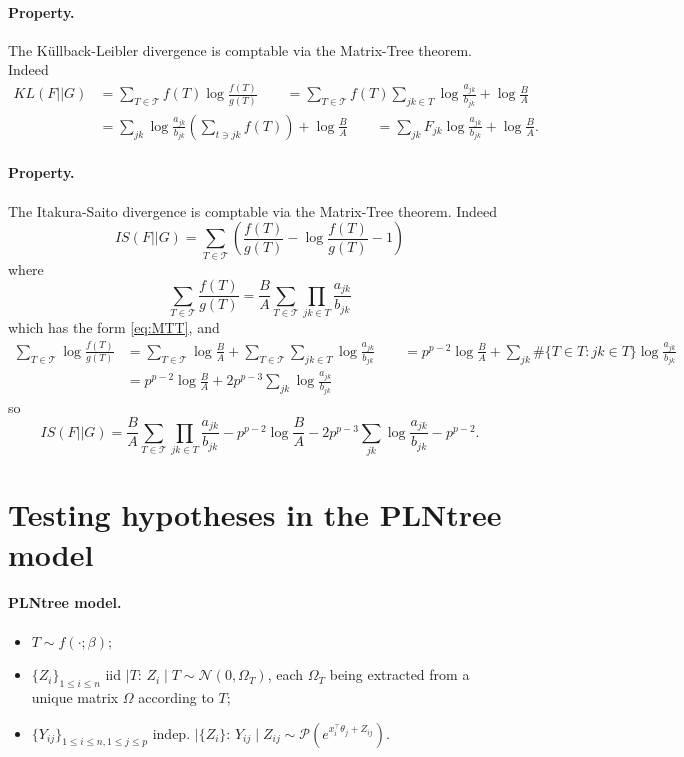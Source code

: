\documentclass[a4paper, 10pt]{article}
\newcommand{\Ncal}{\mathcal{N}}
\newcommand{\Pcal}{\mathcal{P}}
\newcommand{\Tcal}{\mathcal{T}}
\begin{document}
\paragraph{Property.}  The Küllback-Leibler divergence is comptable via the Matrix-Tree theorem. Indeed
\begin{align*}
 KL(F || G) 
 & = \sum_{T \in \Tcal} f(T) \log \frac{f(T)}{g(T)} 
 \qquad = \sum_{T \in \Tcal}  f(T) \sum_{jk \in T} \log \frac{a_{jk}}{b_{jk}} + \log \frac{B}{A} \\
 & = \sum_{jk} \log \frac{a_{jk}}{b_{jk}} \left(\sum_{t \ni jk} f(T) \right) 
 + \log \frac{B}{A} 
 \qquad = \sum_{jk} F_{jk} \log \frac{a_{jk}}{b_{jk}} + \log \frac{B}{A}.
\end{align*}


\paragraph{Property.}  The Itakura-Saito divergence is comptable via the Matrix-Tree theorem. Indeed
$$
IS(F || G) 
= \sum_{T \in \Tcal} \left( \frac{f(T)}{g(T)} - \log \frac{f(T)}{g(T)} - 1 \right)
$$
where
$$
\sum_{T \in \Tcal} \frac{f(T)}{g(T)}
= \frac{B}{A} \sum_{T \in \Tcal}  \prod_{jk \in T} \frac{a_{jk}}{b_{jk}}
$$
which has the form \eqref{eq:MTT}, and
\begin{align*}
 \sum_{T \in \Tcal} \log \frac{f(T)}{g(T)} 
 & = \sum_{T \in \Tcal} \log \frac{B}{A} + \sum_{T \in \Tcal} \sum_{jk \in T} \log \frac{a_{jk}}{b_{jk}} 
 \qquad = p^{p-2} \log \frac{B}{A} + \sum_{jk} \#\{T \in T: jk \in T\} \log \frac{a_{jk}}{b_{jk}}  \\
 & = p^{p-2} \log \frac{B}{A} + 2p^{p-3}\sum_{jk} \log \frac{a_{jk}}{b_{jk}} 
\end{align*}
so
$$
IS(F || G) 
= \frac{B}{A} \sum_{T \in \Tcal} \prod_{jk \in T} \frac{a_{jk}}{b_{jk}} 
- p^{p-2} \log \frac{B}{A} - 2p^{p-3}\sum_{jk} \log \frac{a_{jk}}{b_{jk}}
- p^{p-2}.
$$

\newpage \section{Testing hypotheses in the PLNtree model} 

\paragraph{PLNtree model.}
\begin{itemize}
 \item $T \sim f(\cdot; \beta)$;
 \item $\{Z_i\}_{1 \leq i \leq n}$ iid $\mid T$: $Z_i \mid T \sim \Ncal(0, \Omega_T)$, each $\Omega_T$ being extracted from a unique matrix $\Omega$ according to $T$;
 \item $\{Y_{ij}\}_{1 \leq i \leq n, 1 \leq j \leq p}$ indep. $\mid \{Z_i\}$: $Y_{ij} \mid Z_{ij} \sim \Pcal(e^{x_i^\intercal \theta_j + Z_{ij}})$.
\end{itemize}
\end{document}
